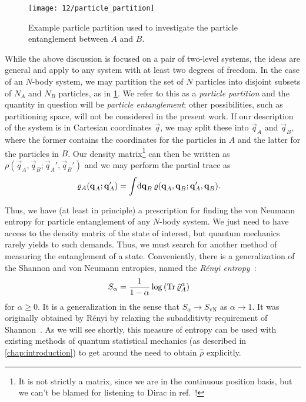 \begin{figure}
	\centering
	\texttt{[image: 12/particle\_partition]}
	\caption[
		Example particle partition
	]{
		Example particle partition used to investigate the particle entanglement between $A$ and $B$.
	}
	\label{fig:particle-partition}
\end{figure}

While the above discussion is focused on a pair of two-level systems, the ideas are general and apply to any system with at least two degrees of freedom.
In the case of an $N$-body system, we may partition the set of $N$ particles into disjoint subsets of $N_A$ and $N_B$ particles, as in \cref{fig:particle-partition}.
We refer to this as a \emph{particle partition} and the quantity in question will be \emph{particle entanglement}; other possibilities, such as partitioning space, will not be considered in the present work.
If our description of the system is in Cartesian coordinates $\vec{q}$, we may split these into $\vec{q}_A$ and $\vec{q}_B$, where the former contains the coordinates for the particles in $A$ and the latter for the particles in $B$.
Our density matrix\footnote{
	It is not strictly a matrix, since we are in the continuous position basis, but we can't be blamed for listening to Dirac in ref.~\cite[69-70]{dirac1981principles}!
} can then be written as $\rho(\vec{q}_A, \vec{q}_B ; \vec{q}_A', \vec{q}_B')$ and we may perform the partial trace as
\begin{align}
	\rho_A(\vec{q}_A ; \vec{q}_A')
	&= \int\! \dif \vec{q}_B \, \rho(\vec{q}_A, \vec{q}_B ; \vec{q}_A', \vec{q}_B).
\end{align}

Thus, we have (at least in principle) a prescription for finding the von Neumann entropy for particle entanglement of any $N$-body system.
We just need to have access to the density matrix of the state of interest, but quantum mechanics rarely yields to such demands.
Thus, we must search for another method of measuring the entanglement of a state.
Conveniently, there is a generalization of the Shannon and von Neumann entropies, named the \emph{Rényi entropy}~\cite{herdman2014path,renyi1961measures}:
\begin{align}
	S_\alpha
	&= \frac{1}{1 - \alpha} \log{\left( \operatorname{Tr}{\hat{\varrho}_A^\alpha} \right)}
\end{align}
for $\alpha \ge 0$.
It is a generalization in the sense that $S_\alpha \to S_\mathrm{vN}$ as $\alpha \to 1$.
It was originally obtained by Rényi by relaxing the subadditivty requirement of Shannon~\cite{shannon1948mathematical,renyi1961measures}.
As we will see shortly, this measure of entropy can be used with existing methods of quantum statistical mechanics (as described in \cref{chap:introduction}) to get around the need to obtain $\hat{\rho}$ explicitly.





